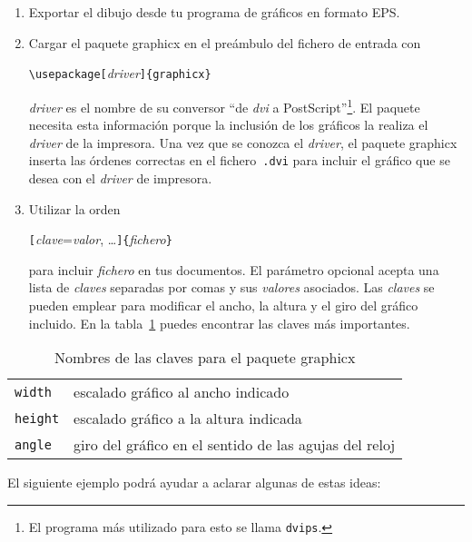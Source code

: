 \begin{enumerate}
\item Exportar el dibujo desde tu programa de gráficos en formato EPS.
\item Cargar el paquete \textsf{graphicx} en el preámbulo del fichero
  de entrada con
\begin{command}
\verb|\usepackage[|\emph{driver}\verb|]{graphicx}|
\end{command}

\emph{driver}  es  el  nombre  de   su  conversor  ``de  \emph{dvi}  a
PostScript''\footnote{El  programa más  utilizado para  esto se  llama
\texttt{dvips}.}.  El  paquete  necesita esta  información  porque  la
inclusión de los gráficos la realiza el \emph{driver} de la impresora.
Una vez que se conozca  el \emph{driver}, el paquete \textsf{graphicx}
inserta las órdenes correctas en el fichero~\texttt{.dvi} para incluir
el gráfico que se desea con el \emph{driver} de impresora.


\item Utilizar la orden

\begin{command}
\verb|[|\emph{clave}=\emph{valor},
 \ldots\verb|]{|\emph{fichero}\verb|}|
\end{command}
para incluir \emph{fichero} en tus documentos. El parámetro opcional
acepta una lista de \emph{claves} separadas por comas y sus
\emph{valores} asociados. Las \emph{claves} se pueden emplear para
modificar el ancho, la altura y el giro del gráfico incluido. En la
tabla~\ref{keyvals} puedes encontrar las claves más importantes.
\end{enumerate}

\begin{table}[htb]
\caption{Nombres de las claves para el paquete \textsf{graphicx}}
\label{keyvals}
\begin{lined}{10.1cm}
\begin{tabular}{@{}ll}
\texttt{width}& escalado gráfico al ancho indicado\\
\texttt{height}& escalado gráfico a la altura indicada\\
\texttt{angle}& giro del gráfico en el sentido de las agujas del reloj
\end{tabular}

\bigskip
\end{lined}
\end{table}

El siguiente ejemplo podrá ayudar a aclarar algunas de estas ideas:


